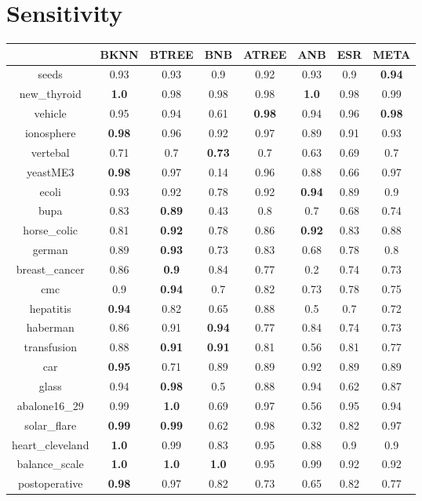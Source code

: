 \documentclass{article}%
\begin{document}
%
\section*{Sensitivity}%
\begin{tabular}{c|ccccccc}%
\hline%
&BKNN&BTREE&BNB&ATREE&ANB&ESR&META\\%
\hline%
seeds&0.93&0.93&0.9&0.92&0.93&0.9&\textbf{0.94}\\%
new\_thyroid&\textbf{1.0}&0.98&0.98&0.98&\textbf{1.0}&0.98&0.99\\%
vehicle&0.95&0.94&0.61&\textbf{0.98}&0.94&0.96&\textbf{0.98}\\%
ionosphere&\textbf{0.98}&0.96&0.92&0.97&0.89&0.91&0.93\\%
vertebal&0.71&0.7&\textbf{0.73}&0.7&0.63&0.69&0.7\\%
yeastME3&\textbf{0.98}&0.97&0.14&0.96&0.88&0.66&0.97\\%
ecoli&0.93&0.92&0.78&0.92&\textbf{0.94}&0.89&0.9\\%
bupa&0.83&\textbf{0.89}&0.43&0.8&0.7&0.68&0.74\\%
horse\_colic&0.81&\textbf{0.92}&0.78&0.86&\textbf{0.92}&0.83&0.88\\%
german&0.89&\textbf{0.93}&0.73&0.83&0.68&0.78&0.8\\%
breast\_cancer&0.86&\textbf{0.9}&0.84&0.77&0.2&0.74&0.73\\%
cmc&0.9&\textbf{0.94}&0.7&0.82&0.73&0.78&0.75\\%
hepatitis&\textbf{0.94}&0.82&0.65&0.88&0.5&0.7&0.72\\%
haberman&0.86&0.91&\textbf{0.94}&0.77&0.84&0.74&0.73\\%
transfusion&0.88&\textbf{0.91}&\textbf{0.91}&0.81&0.56&0.81&0.77\\%
car&\textbf{0.95}&0.71&0.89&0.89&0.92&0.89&0.89\\%
glass&0.94&\textbf{0.98}&0.5&0.88&0.94&0.62&0.87\\%
abalone16\_29&0.99&\textbf{1.0}&0.69&0.97&0.56&0.95&0.94\\%
solar\_flare&\textbf{0.99}&\textbf{0.99}&0.62&0.98&0.32&0.82&0.97\\%
heart\_cleveland&\textbf{1.0}&0.99&0.83&0.95&0.88&0.9&0.9\\%
balance\_scale&\textbf{1.0}&\textbf{1.0}&\textbf{1.0}&0.95&0.99&0.92&0.92\\%
postoperative&\textbf{0.98}&0.97&0.82&0.73&0.65&0.82&0.77\\%
\end{tabular}
\end{document}
